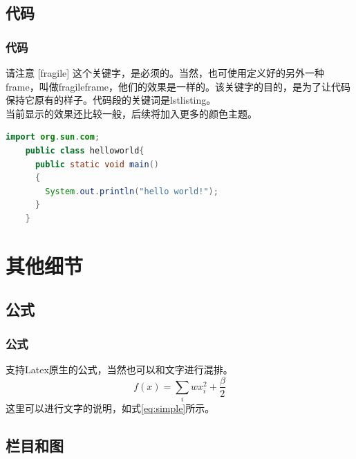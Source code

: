 \documentclass[aspectratio=169,UTF8,t]{beamer}%
\begin{document}
\subsection{代码}

\begin{frame}[fragile]
    \frametitle{代码}
    
    请注意 [fragile] 这个关键字，是必须的。当然，也可使用定义好的另外一种frame，叫做fragileframe，他们的效果是一样的。该关键字的目的，是为了让代码保持它原有的样子。代码段的关键词是lstlisting。\\
    当前显示的效果还比较一般，后续将加入更多的颜色主题。

\begin{lstlisting}[language=Java,caption={src/app/app.module.ts}]
    import org.sun.com;   
    public class helloworld{
      public static void main()
      {
        System.out.println("hello world!");
      }
    }
    \end{lstlisting}
\end{frame}

\section{其他细节}

\subsection{公式}

\begin{frame}
\frametitle{公式}
    支持Latex原生的公式，当然也可以和文字进行混排。
    \begin{equation}
        f(x) = \sum_i wx_i^2 + \frac{\beta}{2} \label{eq:simple}  
    \end{equation}
    这里可以进行文字的说明，如式\eqref{eq:simple}所示。
\end{frame}

\subsection{栏目和图}
\end{document}
